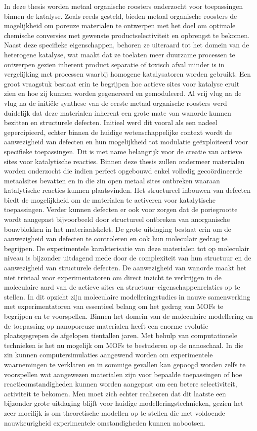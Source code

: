 \npar
In deze thesis worden metaal organische roosters onderzocht voor toepassingen binnen de katalyse. Zoals reeds gesteld, bieden metaal organische roosters de mogelijkheid om poreuze materialen te ontwerpen met het doel om optimale chemische conversies met gewenste productselectiviteit en opbrengst te bekomen. Naast deze specifieke eigenschappen, behoren ze uiteraard tot het domein van de heterogene katalyse, wat maakt dat ze toelaten meer duurzame processen te ontwerpen gezien inherent product separatie of toxisch afval minder is in vergelijking met processen waarbij homogene katalysatoren worden gebruikt. 
\npar
Een groot vraagstuk bestaat erin te begrijpen hoe actieve sites voor katalyse eruit zien en hoe zij kunnen worden gegenereerd en gemoduleerd. Al vrij vlug na de vlug na de initiële synthese van de eerste metaal organische roosters werd duidelijk dat deze materialen inherent een grote mate van wanorde kunnen bezitten en structurele defecten. Initieel werd dit vooral als een nadeel gepercipieerd, echter binnen de huidige wetenschappelijke context wordt de aanwezigheid van defecten en hun mogelijkheid tot modulatie geëxploiteerd voor specifieke toepassingen. Dit is met name belangrijk voor de creatie van actieve sites voor katalytische reacties. Binnen deze thesis zullen ondermeer materialen worden onderzocht die indien perfect opgebouwd enkel volledig gecoördineerde metaalsites bevatten en in die zin open metaal sites ontbreken waaraan katalytische reacties kunnen plaatsvinden. Het structureel inbouwen van defecten biedt de mogelijkheid om de materialen te activeren voor katalytische toepassingen. Verder kunnen defecten er ook voor zorgen dat de poriegrootte wordt aangepast bijvoorbeeld door structureel ontbreken van anorganische bouwblokken in het materiaalskelet. De grote uitdaging bestaat erin om de aanwezigheid van defecten te controleren en ook hun moleculair gedrag te begrijpen. 
\npar
De experimentele karakterisatie van deze materialen tot op moleculair niveau is bijzonder uitdagend mede door de complexiteit van hun structuur en de aanwezigheid van structurele defecten. De aanwezigheid van wanorde maakt het niet triviaal voor experimentatoren om direct inzicht te verkrijgen in de moleculaire aard van de actieve sites en structuur--eigenschappenrelaties op te stellen. In dit opzicht zijn moleculaire modelleringstudies in nauwe samenwerking met experimentatoren van essentieel belang om het gedrag van MOFs te begrijpen en te voorspellen. Binnen het domein van de moleculaire modellering en de toepassing op nanoporeuze materialen heeft een enorme evolutie plaatsgegrepen de afgelopen tientallen jaren. Met behulp van computationele technieken is het nu mogelijk om MOFs te bestuderen op de nanoschaal. In die zin kunnen computersimulaties aangewend worden om experimentele waarnemingen te verklaren en in sommige gevallen kan gepoogd worden zelfs te voorspellen wat aangewezen materialen zijn voor bepaalde toepassingen of hoe reactieomstandigheden kunnen worden aangepast om een betere selectiviteit, activiteit te bekomen. Men moet zich echter realiseren dat dit laatste een bijzonder grote uitdaging blijft voor huidige modelleringstechnieken, gezien het zeer moeilijk is om theoretische modellen op te stellen die met voldoende nauwkeurigheid experimentele omstandigheden kunnen nabootsen. 
